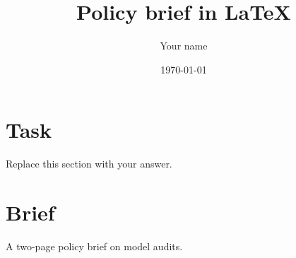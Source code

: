 \documentclass[11pt,a4paper]{article}
\title{Policy brief in LaTeX}
\author{Your name}
\date{\today}
\begin{document}
\maketitle

\section{Task}

Replace this section with your answer.

\section*{Brief}
A two-page policy brief on model audits.
\end{document}
